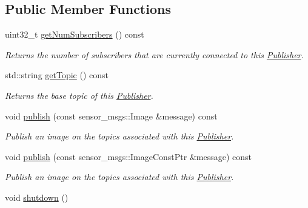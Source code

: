 \subsection*{Public Member Functions}
\begin{DoxyCompactItemize}
\item 
uint32\-\_\-t \hyperlink{classimage__transport_1_1_publisher_ac88d47f80afa429ea135f5bca7448dd9}{get\-Num\-Subscribers} () const 
\begin{DoxyCompactList}\small\item\em Returns the number of subscribers that are currently connected to this \hyperlink{classimage__transport_1_1_publisher}{Publisher}. \end{DoxyCompactList}\item 
\hypertarget{classimage__transport_1_1_publisher_a9c76ade4e9217ba84b4c5e8f71041a39}{std\-::string \hyperlink{classimage__transport_1_1_publisher_a9c76ade4e9217ba84b4c5e8f71041a39}{get\-Topic} () const }\label{classimage__transport_1_1_publisher_a9c76ade4e9217ba84b4c5e8f71041a39}

\begin{DoxyCompactList}\small\item\em Returns the base topic of this \hyperlink{classimage__transport_1_1_publisher}{Publisher}. \end{DoxyCompactList}\item 
\hypertarget{classimage__transport_1_1_publisher_adca2507fe8999ccfdfc6d8871f986e10}{void \hyperlink{classimage__transport_1_1_publisher_adca2507fe8999ccfdfc6d8871f986e10}{publish} (const sensor\-\_\-msgs\-::\-Image \&message) const }\label{classimage__transport_1_1_publisher_adca2507fe8999ccfdfc6d8871f986e10}

\begin{DoxyCompactList}\small\item\em Publish an image on the topics associated with this \hyperlink{classimage__transport_1_1_publisher}{Publisher}. \end{DoxyCompactList}\item 
\hypertarget{classimage__transport_1_1_publisher_aa707c681bc6760150aca17d25f532113}{void \hyperlink{classimage__transport_1_1_publisher_aa707c681bc6760150aca17d25f532113}{publish} (const sensor\-\_\-msgs\-::\-Image\-Const\-Ptr \&message) const }\label{classimage__transport_1_1_publisher_aa707c681bc6760150aca17d25f532113}

\begin{DoxyCompactList}\small\item\em Publish an image on the topics associated with this \hyperlink{classimage__transport_1_1_publisher}{Publisher}. \end{DoxyCompactList}\item 
\hypertarget{classimage__transport_1_1_publisher_a072fafb7790734db8ecda3c6704b9396}{void \hyperlink{classimage__transport_1_1_publisher_a072fafb7790734db8ecda3c6704b9396}{shutdown} ()}\label{classimage__transport_1_1_publisher_a072fafb7790734db8ecda3c6704b9396}


\end{DoxyCompactItemize}
